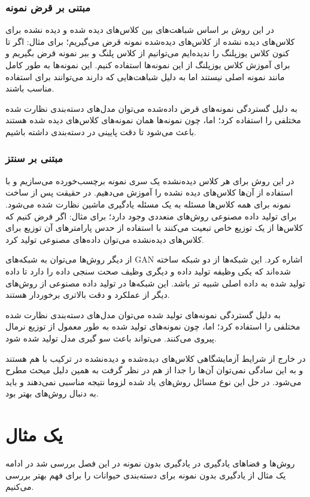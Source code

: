 \subsubsection{مبتنی بر قرض نمونه‌}
در این روش بر اساس شباهت‌های بین کلاس‌های دیده شده و دیده نشده برای کلاس‌های دیده نشده از کلاس‌های دیده‌شده نمونه قرض می‌گیریم؛ برای مثال: اگر تا کنون کلاس یوزپلنگ را ندیده‌ایم می‌توانیم از کلاس پلنگ و ببر نمونه قرض بگیریم و برای آموزش کلاس یوزپلنگ از این نمونه‌ها استفاده کنیم. این نمونه‌ها به طور کامل مانند نمونه اصلی نیستند اما به دلیل شباهت‌هایی که دارند می‌توانند برای استفاده مناسب باشند.

به دلیل گستردگی نمونه‌های قرض داده‌شده می‌توان مدل‌های دسته‌بندی نظارت شده مختلفی را استفاده کرد؛ اما، چون نمونه‌ها همان نمونه‌های کلاس‌های دیده شده هستند باعث می‌شود تا دقت پایینی در دسته‌بندی داشته باشیم.

\subsubsection{مبتنی بر سنتز‌}
در این روش برای هر کلاس دیده‌نشده یک سری نمونه برچسب‌خورده می‌سازیم و با استفاده از آن‌ها کلاس‌های دیده نشده را آموزش می‌دهیم. در حقیقت پس از ساخت نمونه برای همه کلاس‌ها مسئله به یک مسئله یادگیری ماشین نظارت شده می‌شود. برای تولید داده مصنوعی روش‌های منعددی وجود دارد؛ برای مثال: اگر فرض کنیم که کلاس‌ها از یک توزیع خاص تبعیت می‌کنند با استفاده از حدس پارامتر‌های آن توزیع برای کلاس‌های دیده‌نشده می‌توان داده‌های مصنوعی تولید کرد.

از دیگر روش‌ها می‌توان به شبکه‌های GAN اشاره کرد. این شبکه‌ها از دو شبکه ساخته شده‌اند که یکی وظیفه تولید داده و دیگری وظیف صحت سنجی داده را دارد تا داده تولید شده به داده اصلی شبیه تر باشد. این شبکه‌ها در تولید داده مصنوعی از روش‌های دیگر از عملکرد و دقت بالاتری برخوردار هستند.

به دلیل گستردگی نمونه‌های تولید شده می‌توان مدل‌های دسته‌بندی نظارت شده مختلفی را استفاده کرد؛ اما، چون نمونه‌های تولید شده به طور معمول از توزیع نرمال پیروی می‌کنند. می‌تواند باعث سو گیری مدل تولید شده شود.

در خارج از شرایط آزمایشگاهی کلاس‌های دیده‌شده و دیده‌نشده در ترکیب با هم هستند و به این سادگی نمی‌توان آن‌ها را جدا از هم در نظر گرفت به همین دلیل میحث 
مطرح می‌شود. در حل این نوع مسائل روش‌های یاد شده لزوما نتیجه مناسبی نمی‌دهند و باید به دنبال روش‌های بهتر بود.

\section{یک مثال}
روش‌ها و فضاهای یادگیری در یادگیری بدون نمونه در این فصل بررسی شد در ادامه یک مثال از یادگیری بدون نمونه برای دسته‌بندی حیوانات را برای فهم بهتر بررسی می‌کنیم.

